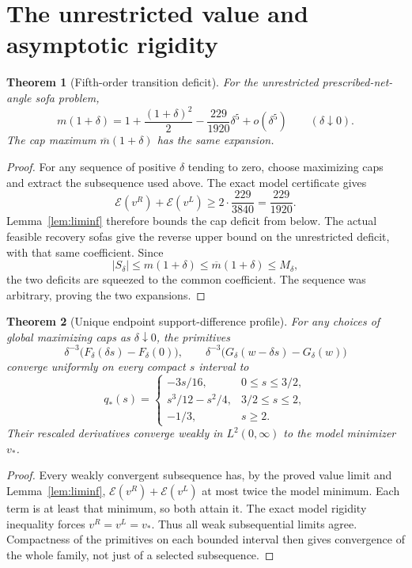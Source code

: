 \documentclass[11pt]{article}
\newtheorem{theorem}{Theorem}[section]
\begin{document}
\section{The unrestricted value and asymptotic rigidity}
\begin{theorem}[Fifth-order transition deficit]\label{thm:value}
For the unrestricted prescribed-net-angle sofa problem,
\[
 \boxed{m(1+\delta)=1+\frac{(1+\delta)^2}{2}-\frac{229}{1920}\delta^5+o(\delta^5)}
 \qquad(\delta\downarrow0).
\]
The cap maximum $\overline m(1+\delta)$ has the same expansion.
\end{theorem}
\begin{proof}
For any sequence of positive $\delta$ tending to zero, choose maximizing caps and extract the subsequence used above. The exact model certificate gives
\[
 \mathscr E(v^R)+\mathscr E(v^L)\ge2\cdot\frac{229}{3840}=\frac{229}{1920}.
\]
Lemma~\ref{lem:liminf} therefore bounds the cap deficit from below. The actual feasible recovery sofas give the reverse upper bound on the unrestricted deficit, with that same coefficient. Since
\[
 |S_\delta|\le m(1+\delta)\le\overline m(1+\delta)\le M_\delta,
\]
the two deficits are squeezed to the common coefficient. The sequence was arbitrary, proving the two expansions.
\end{proof}

\begin{theorem}[Unique endpoint support-difference profile]
For any choices of global maximizing caps as $\delta\downarrow0$, the primitives
\[
 \delta^{-3}\bigl(F_\delta(\delta s)-F_\delta(0)\bigr),\qquad
 \delta^{-3}\bigl(G_\delta(w-\delta s)-G_\delta(w)\bigr)
\]
converge uniformly on every compact $s$ interval to
\[
 q_*(s)=\begin{cases}
 -3s/16,&0\le s\le3/2,\\
 s^3/12-s^2/4,&3/2\le s\le2,\\
 -1/3,&s\ge2.
 \end{cases}
\]
Their rescaled derivatives converge weakly in $L^2(0,\infty)$ to the model minimizer $v_*$.
\end{theorem}
\begin{proof}
Every weakly convergent subsequence has, by the proved value limit and Lemma~\ref{lem:liminf}, $\mathscr E(v^R)+\mathscr E(v^L)$ at most twice the model minimum. Each term is at least that minimum, so both attain it. The exact model rigidity inequality forces $v^R=v^L=v_*$. Thus all weak subsequential limits agree. Compactness of the primitives on each bounded interval then gives convergence of the whole family, not just of a selected subsequence.
\end{proof}
\end{document}
